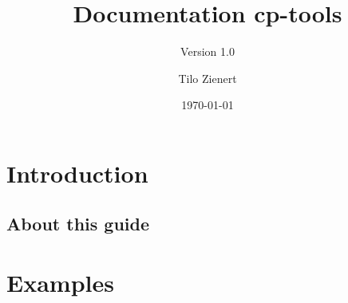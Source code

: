 %




	\title{Documentation cp-tools}
	\subtitle{Version 1.0}
	\author{Tilo Zienert}
	\date{\today}

	\lowertitleback{Copyright (C)  2018 Tilo Zienert.\\
		Permission is granted to copy, distribute and/or modify this document\\
		under the terms of the GNU Free Documentation License, Version 1.3\\
		or any later version published by the Free Software Foundation;\\
		with no Invariant Sections, no Front-Cover Texts, and no Back-Cover Texts.\\
		A copy of the license is included in the section entitled "GNU\\
		Free Documentation License".}

	\maketitle

	\setcounter{page}{1}
	\renewcommand{\thepage}{\Roman{page}}
	\pagestyle{plain}

	\tableofcontents
	\clearpage
	\setcounter{page}{1}
	\renewcommand{\thepage}{\arabic{page}}
	\pagestyle{headings}

	\chapter{Introduction}
		
	\section{About this guide}
		
	
	\chapter{Examples}
		
	
